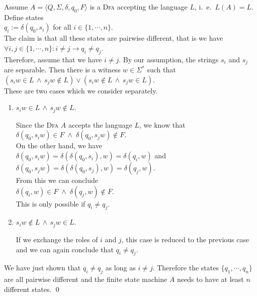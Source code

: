 \proofEng
Assume $A = \langle Q, \Sigma, \delta, q_0, F\rangle$ is a \textsc{Dfa}  accepting the
language $L$, i.~e.~$L(A) = L$.  Define states
\\[0.2cm]
\hspace*{1.3cm}
$q_i := \delta(q_0, s_i)$ \quad for all $i \in \{ 1,\cdots,n \}$.
\\[0.2cm]
The claim is that all these states are pairwise different, that is we have
\\[0.2cm]
\hspace*{1.3cm}
$\forall i,j \in \{ 1, \cdots, n \}: i \not=j \rightarrow q_i \not= q_j$.
\\[0.2cm]
Therefore, assume that we have $i \not= j$.  
By our assumption, the strings $s_i$ and $s_j$ are separable.  Then there is a
witness $w \in \Sigma^*$ such that
\\[0.2cm]
\hspace*{1.3cm}
$(s_iw \in L \,\wedge\, s_jw \not\in L) \vee (s_iw \not\in L \,\wedge\, s_jw \in L)$.
\\[0.2cm]
These are two cases which we consider separately.
\begin{enumerate}
\item $s_iw \in L \,\wedge\, s_jw \not\in L$.

      Since the \textsc{Dfa} $A$ accepts the language $L$, we know that
      \\[0.2cm]
      \hspace*{1.3cm}
      $\delta(q_0, s_iw) \in F \;\wedge\; \delta(q_0, s_jw) \not\in F$.
      \\[0.2cm]
      On the other hand, we have
      \\[0.2cm]
      \hspace*{1.3cm}
      $\delta(q_0, s_iw) = \delta(\delta(q_0, s_i), w) = \delta(q_i, w)$ \quad and \quad
      $\delta(q_0, s_jw) = \delta(\delta(q_0, s_j), w) = \delta(q_j, w)$.
      \\[0.2cm]
      From this we can conclude
      \\[0.2cm]
      \hspace*{1.3cm}
      $\delta(q_i, w) \in F \;\wedge\; \delta(q_j, w) \not\in F$.
      \\[0.2cm]
      This is only possible if $q_i \not= q_j$.
\item $s_iw \not\in L \,\wedge\, s_jw \in L$.

      If we exchange the roles of $i$ and $j$, this case is reduced to the previous case
      and we can again conclude that $q_i \not= q_j$.
\end{enumerate}
We have just shown that $q_i \not= q_j$ as long as $i \not= j$.  Therefore the states
$\{ q_1, \cdots, q_n \}$ are all pairwise different and the finite state machine $A$ needs
to have at least $n$ different states.
\qed
\pagebreak

